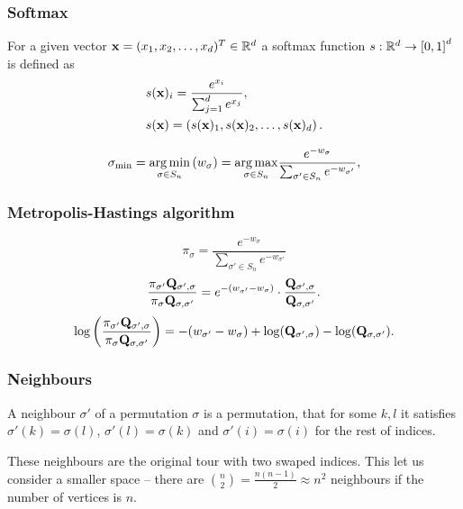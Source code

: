 \begin{frame}
	\frametitle{Softmax}
	\begin{definition}
		For a given vector $\mathbf{x} = (x_1, x_2, \ldots, x_d)^T \in \mathbb{R}^d$ a softmax function $s: \mathbb{R}^d \rightarrow \left[0, 1\right]^d$ is defined as
		\begin{align*}
		&s(\mathbf{x})_i = \frac{e^{x_i}}{\sum_{j=1}^{d} e^{x_j}}, \\
		&s(\mathbf{x}) = \left( s(\mathbf{x})_1, s(\mathbf{x})_2, \ldots, s(\mathbf{x})_d \right).
		\end{align*}
	\end{definition}
	\begin{equation*}
		\sigma_{\min} = \underset{\sigma \in S_n}{\operatorname*{arg\,min}} \left( w_{\sigma} \right) = \underset{\sigma \in S_n}{\operatorname*{arg\,max}} \frac{e^{-w_{\sigma}}}{\sum_{\sigma' \in S_n} e^{-w_{\sigma'}}},
	\end{equation*}
\end{frame}

\begin{frame}
	\frametitle{Metropolis-Hastings algorithm}
	\begin{equation*}
		\pi_\sigma = \frac{e^{-w_{\sigma}}}{\sum_{\sigma' \in S_n} e^{-w_{\sigma'}}}
	\end{equation*}
	\begin{equation*}
		\frac{\pi_{\sigma'} \mathbf{Q}_{\sigma',\sigma}}{\pi_\sigma \mathbf{Q}_{\sigma,\sigma'}} = e^{-(w_{\sigma'}-w_\sigma)} \cdot \frac{\mathbf{Q}_{\sigma',\sigma}}{\mathbf{Q}_{\sigma,\sigma'}}.
	\end{equation*}
	\begin{equation*}
		\log \left( \frac{\pi_{\sigma'} \mathbf{Q}_{\sigma',\sigma}}{\pi_\sigma \mathbf{Q}_{\sigma,\sigma'}} \right) = -(w_{\sigma'}-w_\sigma) + \log(\mathbf{Q}_{\sigma',\sigma}) - \log(\mathbf{Q}_{\sigma,\sigma'}).
	\end{equation*}
\end{frame}

\begin{frame}
	\frametitle{Neighbours}
	\begin{definition}
		A neighbour $\sigma'$ of a permutation $\sigma$ is a permutation, that for some $k, l$ it satisfies $\sigma'(k) = \sigma(l)$, $\sigma'(l) = \sigma(k)$ and $\sigma'(i) = \sigma(i)$ for the rest of indices.
	\end{definition}
	These neighbours are the original tour with two swaped indices. This let  us consider a smaller space -- there are $\binom{n}{2} = \frac{n(n-1)}{2} \approx n^2$ neighbours if the number of vertices is $n$.
\end{frame}

